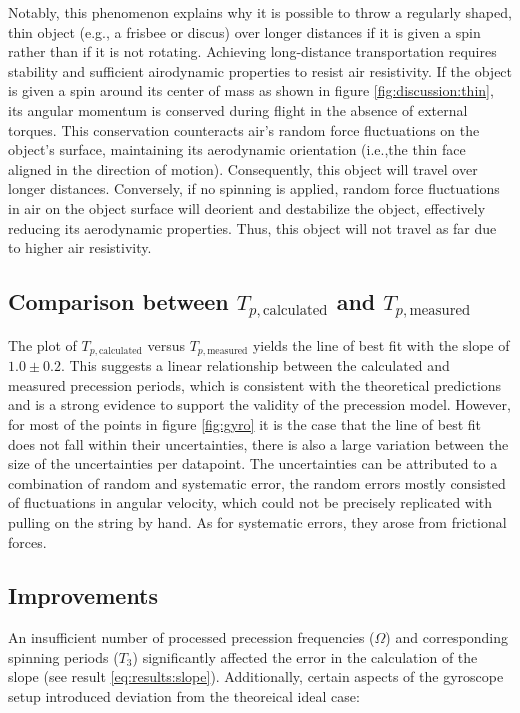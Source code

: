 \begin{multicols}{2}
Notably, this phenomenon explains why it is possible to throw a regularly shaped, thin object (e.g., a frisbee or discus) over longer distances if it is given a spin rather than if it is not rotating. Achieving long-distance transportation requires stability and sufficient airodynamic properties to resist air resistivity. If the object is given a spin around its center of mass as shown in figure \ref{fig:discussion:thin}, its angular momentum is conserved during flight in the absence of external torques. This conservation counteracts air's random force fluctuations on the object's surface, maintaining its aerodynamic orientation (i.e.,the thin face aligned in the direction of motion). Consequently, this object will travel over longer distances. Conversely, if no spinning is applied, random force fluctuations in air on the object surface will deorient and destabilize the object, effectively reducing its aerodynamic properties. Thus, this object will not travel as far due to higher air resistivity. 

\subsection{Comparison between $T_{p, \text{calculated}}$ and $T_{p, \text{measured}}$}

The plot of $T_{p, \text{calculated}}$ versus $T_{p, \text{measured}}$ yields the line of best fit with the slope of $1.0 \pm 0.2$. This suggests a linear relationship between the calculated and measured precession periods, which is consistent with the theoretical predictions and is a strong evidence to support the validity of the precession model.
However, for most of the points in figure \ref{fig:gyro} it is the case that the line of best fit does not fall within their uncertainties, there is also a large variation between the size of the uncertainties per datapoint. The uncertainties can be attributed to a combination of random and systematic error, the random errors mostly consisted of fluctuations in angular velocity, which could not be precisely replicated with pulling on the string by hand. As for systematic errors, they arose from frictional forces.

\subsection{Improvements} \label{sec:discussion:improvements}

An insufficient number of processed precession frequencies ($\Omega$) and corresponding spinning periods ($T_{3}$) significantly affected the error in the calculation of the slope (see result \ref{eq:results:slope}). Additionally, certain aspects of the gyroscope setup introduced deviation from the theoreical ideal case:


\end{multicols}
